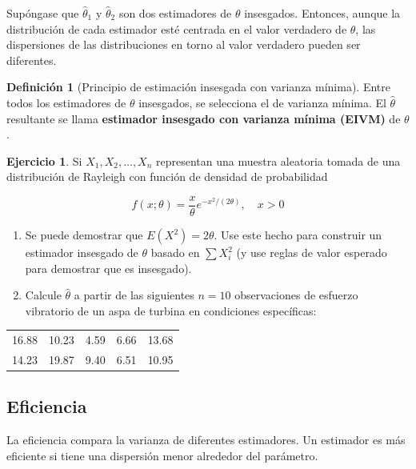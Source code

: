 \documentclass[
  11pt,
]{book}
\theoremstyle{definition}
\newtheorem{definition}{Definición}[chapter]
\theoremstyle{definition}
\theoremstyle{definition}
\newtheorem{exercise}{Ejercicio}[chapter]
\theoremstyle{definition}
\theoremstyle{remark}
\begin{document}
Supóngase que \(\hat{\theta}_1\) y \(\hat{\theta}_2\) son dos estimadores de \(\theta\) insesgados. Entonces, aunque la distribución de cada estimador esté centrada en el valor verdadero de \(\theta\), las dispersiones de las distribuciones en torno al valor verdadero pueden ser diferentes.

\begin{definition}[Principio de estimación insesgada con varianza mínima]
Entre todos los estimadores de \(\theta\) insesgados, se selecciona el de varianza mínima. El \(\hat{\theta}\) resultante se llama \textbf{estimador insesgado con varianza mínima (EIVM)} de \(\theta\).
\end{definition}

\begin{exercise}

Si \(X_1, X_2, \ldots, X_n\) representan una muestra aleatoria tomada de una distribución de Rayleigh con función de densidad de probabilidad

\[
f(x; \theta) = \frac{x}{\theta} e^{-x^2/(2\theta)}, \quad x > 0
\]

\begin{enumerate}
\def\labelenumi{\alph{enumi}.}
\item
  Se puede demostrar que \(E(X^2) = 2\theta\). Use este hecho para construir un estimador insesgado de \(\theta\) basado en \(\sum X_i^2\) (y use reglas de valor esperado para demostrar que es insesgado).
\item
  Calcule \(\hat{\theta}\) a partir de las siguientes \(n = 10\) observaciones de esfuerzo vibratorio de un aspa de turbina en condiciones específicas:
\end{enumerate}

\begin{table}[H]
\centering
\begin{tabular}[t]{ccccc}
\hline
16.88 & 10.23 & 4.59 & 6.66 & 13.68\\
14.23 & 19.87 & 9.40 & 6.51 & 10.95\\
\hline
\end{tabular}
\end{table}

\end{exercise}

\subsection{Eficiencia}\label{eficiencia}

La eficiencia compara la varianza de diferentes estimadores. Un estimador es más eficiente si tiene una dispersión menor alrededor del parámetro.
\end{document}
